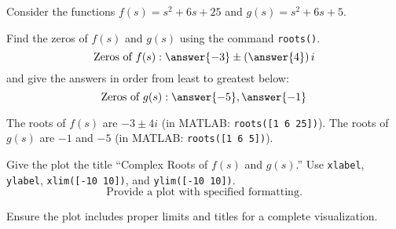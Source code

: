 \documentclass{ximera}
\author{Jont Allen}
\begin{document}
\begin{problem}
    Consider the functions \(f(s) = s^2 + 6s + 25\) and \(g(s) = s^2 + 6s + 5\).
    
    Find the zeros of \(f(s)\) and \(g(s)\) using the command \texttt{roots()}.
    \[
    \text{Zeros of } f(s): \answer{-3} \pm \left(\answer{4}\right)i
    \]
    and give the answers in order from least to greatest below:
    \[
    \text{Zeros of } g(s): \answer{-5}, \answer{-1}
    \]
    \begin{feedback}[correct]
    The roots of \(f(s)\) are \(-3 \pm 4i\) (in MATLAB: \texttt{roots([1 6 25])}). The roots of \(g(s)\) are \(-1\) and \(-5\) (in MATLAB: \texttt{roots([1 6 5])}).
    \end{feedback}
\end{problem}


\begin{problem}
    Give the plot the title “Complex Roots of \(f(s)\) and \(g(s)\).” Use \texttt{xlabel}, \texttt{ylabel}, \texttt{xlim([-10 10])}, and \texttt{ylim([-10 10])}.
    \[
    \text{Provide a plot with specified formatting.}
    \]
    \begin{feedback}[correct]
    Ensure the plot includes proper limits and titles for a complete visualization.
    \end{feedback}
\end{problem}
\end{document}
